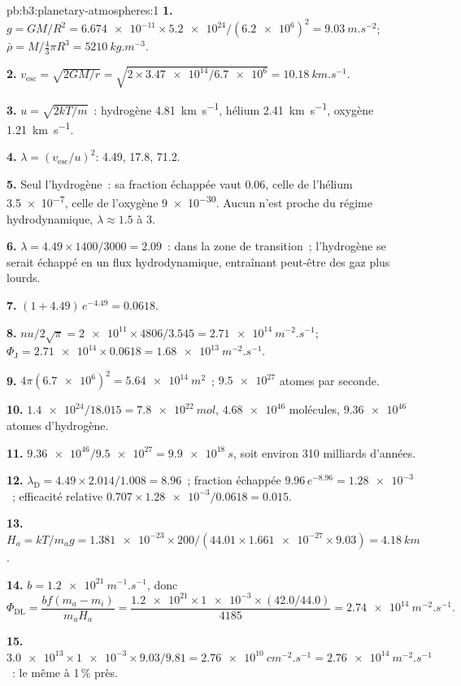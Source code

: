 \begin{solution}{pb:b3:planetary-atmospheres:1}
\textbf{1.} $g = GM/R^2 = \num{6.674e-11}\times\num{5.2e24}/(\num{6.2e6})^2 =
\qty{9.03}{m.s^{-2}}$; $\bar\rho = M/\tfrac43\pi R^3 = \qty{5210}{kg.m^{-3}}$.

\textbf{2.} $v_\mathrm{esc} = \sqrt{2GM/r} = \sqrt{2\times\num{3.47e14}/\num{6.7e6}}
= \qty{10.18}{km.s^{-1}}$.

\textbf{3.} $u = \sqrt{2kT/m}$~: hydrogène \qty{4.81}{km.s^{-1}}, hélium
\qty{2.41}{km.s^{-1}}, oxygène \qty{1.21}{km.s^{-1}}.

\textbf{4.} $\lambda = (v_\mathrm{esc}/u)^2$: 4.49, 17.8, 71.2.

\textbf{5.} Seul l'hydrogène~: sa fraction échappée vaut 0.06, celle de l'hélium
\num{3.5e-7}, celle de l'oxygène \num{9e-30}. Aucun n'est proche du régime hydrodynamique,
$\lambda \approx 1.5$ à 3.

\textbf{6.} $\lambda = 4.49\times1400/3000 = 2.09$~: dans la zone de transition~;
l'hydrogène se serait échappé en un flux hydrodynamique, entraînant peut-être
des gaz plus lourds.

\textbf{7.} $(1 + 4.49)\,e^{-4.49} = 0.0618$.

\textbf{8.} $n u/2\sqrt\pi = \num{2e11}\times4806/3.545 = \qty{2.71e14}{m^{-2}.s^{-1}}$;
$\Phi_\mathrm J = \num{2.71e14}\times0.0618 = \qty{1.68e13}{m^{-2}.s^{-1}}$.

\textbf{9.} $4\pi(\num{6.7e6})^2 = \qty{5.64e14}{m^2}$~; $\num{9.5e27}$ atomes par
seconde.

\textbf{10.} $\num{1.4e24}/18.015 = \qty{7.8e22}{mol}$, $\num{4.68e46}$ molécules,
$\num{9.36e46}$ atomes d'hydrogène.

\textbf{11.} $\num{9.36e46}/\num{9.5e27} = \qty{9.9e18}{s}$, soit environ 310 milliards
d'années.

\textbf{12.} $\lambda_\mathrm D = 4.49\times2.014/1.008 = 8.96$~; fraction échappée
$9.96\,e^{-8.96} = \num{1.28e-3}$~; efficacité relative $0.707\times
\num{1.28e-3}/0.0618 = 0.015$.

\textbf{13.} $H_a = kT/m_a g = \num{1.381e-23}\times200/(44.01\times\num{1.661e-27}
\times9.03) = \qty{4.18}{km}$.

\textbf{14.} $b = \qty{1.2e21}{m^{-1}.s^{-1}}$, donc
\[
\Phi_\mathrm{DL} = \frac{b f(m_a - m_i)}{m_a H_a}
= \frac{\num{1.2e21}\times\num{1e-3}\times(42.0/44.0)}{4185}
= \qty{2.74e14}{m^{-2}.s^{-1}}.
\]

\textbf{15.} $\num{3.0e13}\times\num{1e-3}\times9.03/9.81 =
\qty{2.76e10}{cm^{-2}.s^{-1}} = \qty{2.76e14}{m^{-2}.s^{-1}}$~: le même
à 1\,\% près.


\end{solution}
